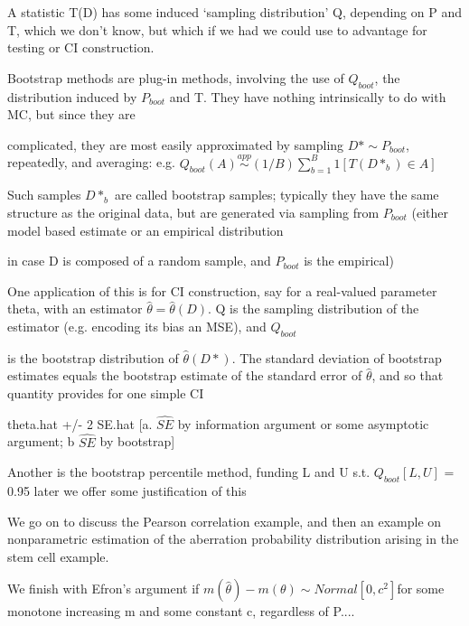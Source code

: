 \documentclass[11pt,a4paper]{article}
\begin{document}
	A statistic T(D) has some induced `sampling distribution' Q, depending on P and T, which we don't know, but which if we had we could use to advantage for testing or CI construction.
	
	Bootstrap methods are plug-in methods, involving the use of $Q_{boot}$, the distribution induced by $P_{boot}$ and T.   They have nothing intrinsically to do with MC, but since they are
	
	complicated, they are most easily approximated by sampling $D* \sim P_{boot}$, repeatedly, and averaging: e.g.  $Q_{boot}(A) \stackrel{app}{\sim} (1/B) \sum_{b=1}^B 1[ T(D*_b) \in A ]$
	
	Such samples $D*_b$ are called bootstrap samples; typically they have the same structure as the original data, but are generated via sampling from $P_{boot}$ (either model based estimate or an empirical distribution
	
	in case D is composed of a random sample, and $P_{boot}$ is the empirical)
	
	One application of this is for CI construction, say for a real-valued parameter theta, with an estimator $\hat{\theta} = \hat{\theta}(D)$.  Q is the sampling distribution of the estimator (e.g. encoding its bias an MSE), and $Q_{boot}$
	
	is the bootstrap distribution of $\hat{\theta}(D*)$.   The standard deviation of bootstrap estimates equals the bootstrap estimate of the standard error of $\hat{\theta}$, and so that quantity provides for one simple CI
	
	theta.hat +/- 2 SE.hat       [a. $\hat{SE}$ by information argument or some asymptotic argument; b $\hat{SE}$ by bootstrap]
	
	Another is the bootstrap percentile method, funding L and U s.t. $Q_{boot}[L,U]$ = 0.95  { later we offer some justification of this }
	
	We go on to discuss the Pearson correlation example, and then an example on nonparametric estimation of the aberration probability distribution arising in the stem cell example.
	
	We finish with Efron's argument if $m(\hat{\theta}) - m(\theta) \sim Normal[ 0, c^2 ] $for some monotone increasing m and some constant c, regardless of P....
\end{document}
